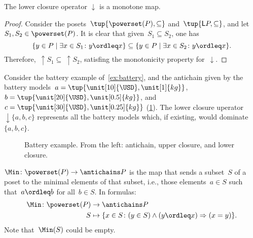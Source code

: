 \begin{lemma}
    The lower closure operator $\downarrow$ is a monotone map.
\end{lemma}

\begin{proof}
    Consider the posets~$\tup{\powerset(P),\subseteq}$ and~$\tup{\mathsf{L}P,\subseteq}$, and let~$S_1,S_2\in \powerset(P)$. It is clear that given~$S_1\subseteq S_2$, one has
    \begin{equation}
        \{y\in P\mid \exists x\in S_1\colon y\ordleq x\} \subseteq \{y\in P\mid \exists x\in S_2\colon y\ordleq x\}.
    \end{equation}
    Therefore,~$\uparrow S_1\subseteq \ \uparrow S_2$, satisfing the monotonicity property for~$\downarrow$.
\end{proof}



\begin{example}
    Consider the battery example of~\cref{ex:battery}, and the antichain given by the battery models~$a=\tup{\unit[10]{\USD},\unit[1]{kg}}$,~$b=\tup{\unit[20]{\USD},\unit[0.5]{kg}}$, and~$c=\tup{\unit[30]{\USD},\unit[0.25]{kg}}$ (\cref{fig:examplebatt}).
    The lower closure uperator~$\downarrow\{a,b,c\}$ represents all the battery models which, if existing, would dominate~$\{a,b,c\}$.

\end{example}
\begin{figure}[h!]
    \begin{center}
    \end{center}
    \caption{Battery example. From the left: antichain, upper closure, and lower closure.
    \label{fig:examplebatt}}
\end{figure}


\begin{definition}[Min]
    \label{def:Min}
    $\Min \colon \powerset(P) \to \antichains P$ is the map that sends a subset~$S$ of a poset to the minimal elements of that subset, i.e., those elements~$a \in S$ such that~$a \ordleq b$ for all~$b \in S$. In formulas:
    \begin{equation}
        \begin{aligned}
            \Min \colon \powerset(P) &\to \antichains P\\
            S&\mapsto \{ x\in S\colon (y\in S)\wedge(y\ordleq x)\Rightarrow (x=y)\}.
        \end{aligned}
    \end{equation}
    Note that~$\Min(S)$ could be empty.
\end{definition}

